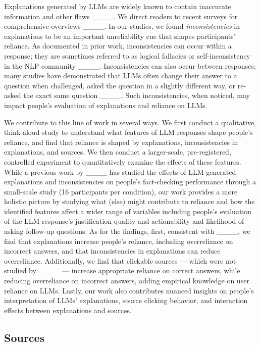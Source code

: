 Explanations generated by LLMs are widely known to contain inaccurate information and other flaws ____. We direct readers to recent surveys for comprehensive overviews ____. In our studies, we found \textit{inconsistencies} in explanations to be an important unreliability cue that shapes participants' reliance. As documented in prior work, inconsistencies can occur within a response; they are sometimes referred to as logical fallacies or self-inconsistency in the NLP community ____. Inconsistencies can also occur between responses; many studies have demonstrated that LLMs often change their answer to a question when challenged, asked the question in a slightly different way, or re-asked the exact same question ____. Such inconsistencies, when noticed, may impact people's evaluation of explanations and reliance on LLMs.



We contribute to this line of work in several ways. We first conduct a qualitative, think-aloud study to understand what features of LLM responses shape people's reliance, and find that reliance is shaped by explanations, inconsistencies in explanations, and sources. We then conduct a larger-scale, pre-registered, controlled experiment to quantitatively examine the effects of these features.
While a previous work by ____ has studied the effects of LLM-generated explanations and inconsistencies on people's fact-checking performance through a small-scale study (16 participants per condition), our work provides a more holistic picture by studying what (else) might contribute to reliance and how the identified features affect a wider range of variables including people's evaluation of the LLM response's justification quality and actionability and likelihood of asking follow-up questions. 
As for the findings, first, consistent with ____, we find that explanations increase people's reliance, including overreliance on incorrect answers, and that inconsistencies in explanations can reduce overreliance. 
Additionally, we find that clickable sources --- which were not studied by ____ --- increase appropriate reliance on correct answers, while reducing overreliance on incorrect answers, adding empirical knowledge on user reliance on LLMs. 
Lastly, our work also contributes nuanced insights on people's interpretation of LLMs' explanations, source clicking behavior, and interaction effects between explanations and sources.



\subsection{Sources}

